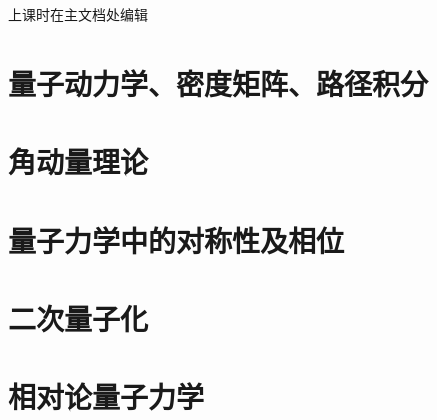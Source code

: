 \documentclass[UTF8]{ctexbook}
\begin{document}


上课时在主文档处编辑



\chapter{量子动力学、密度矩阵、路径积分}
\chapter{角动量理论}
\chapter{量子力学中的对称性及相位}
\chapter{二次量子化}
\chapter{相对论量子力学}
\end{document}
